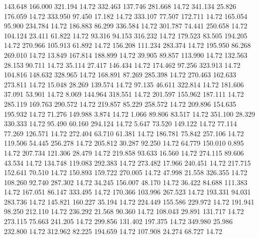  143.648  166.000  321.194        14.72
 332.463  137.746  281.668        14.72
 341.134   25.826  176.059        14.72
 333.950   97.450   17.182        14.72
 333.107   77.507  172.711        14.72
 165.054   95.900  234.784        14.72
 186.883   86.299  336.584        14.72
 301.787   74.441  250.658        14.72
 104.124   23.411   61.822        14.72
  93.316   94.153  316.232        14.72
 179.523   83.505  194.205        14.72
 270.966  105.913   61.892        14.72
 156.208  111.234  283.374        14.72
 195.950   86.268  269.010        14.72
  13.849  167.814  188.899        14.72
  39.905   89.857  113.990        14.72
 132.563   28.153   90.711        14.72
  35.114   27.417  146.434        14.72
 174.462   97.256  323.913        14.72
 104.816  148.632  328.965        14.72
 168.891   87.269  285.398        14.72
 270.463  162.633  273.811        14.72
  15.048   28.269  139.574        14.72
  97.135   46.611  322.814        14.72
 181.606   37.091   53.901        14.72
   8.069  144.964  318.551        14.72
 201.597  155.962  187.111        14.72
 285.119  169.763  290.572        14.72
 219.857   85.229  258.572        14.72
 209.896  154.635  195.932        14.72
  71.276  149.988    3.874        14.72
   1.066   89.806   83.517        14.72
 351.100   28.329  330.333        14.72
  95.490   60.160  294.124        14.72
   5.647   73.520  149.122        14.72
  77.114   77.269  126.571        14.72
 272.404   63.710   61.381        14.72
 186.781   75.842  257.106        14.72
 119.506   54.445  256.278        14.72
 205.812   30.287   92.250        14.72
  64.779  150.010    0.895        14.72
 207.734  121.306   28.479        14.72
 219.858   93.633   16.560        14.72
 274.115   89.606   43.534        14.72
 134.748  119.083  292.383        14.72
 273.482   17.966  240.451        14.72
 217.715  152.641   70.510        14.72
 150.893  159.722  270.005        14.72
  47.998   21.558  326.355        14.72
 108.260   92.740  287.302        14.72
  34.245  156.007   48.170        14.72
  36.422   84.688  111.383        14.72
 167.051   86.147  333.495        14.72
 170.366  103.996  267.523        14.72
 193.331   94.031  283.736        14.72
 145.821  160.227   35.194        14.72
 224.449  155.586  229.972        14.72
 191.941   98.250  212.110        14.72
 236.292   21.568   90.360        14.72
 108.043   29.891  131.717        14.72
 273.115   75.663  241.205        14.72
 299.856  131.402  197.375        14.72
 349.980   25.986  232.800        14.72
 312.962   82.225  194.659        14.72
 107.908   24.274   68.727        14.72
